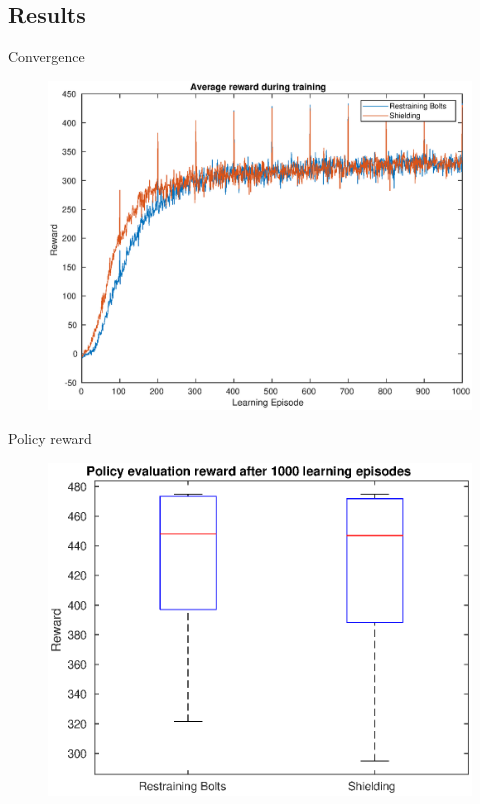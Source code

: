 \documentclass[kul]{kulakbeamer}
\begin{document}
\subsection{Results}
\begin{frame}{Convergence}
    \begin{figure}
        \centering
        \includegraphics[width=.87\textwidth]{learning_reward.eps}
    \end{figure}{}
\end{frame}{}
\begin{frame}{Policy reward}
    \begin{figure}
        \centering
        \includegraphics[width=.84\textwidth]{policy_reward.eps}
    \end{figure}{}
\end{frame}{}
\end{document}
